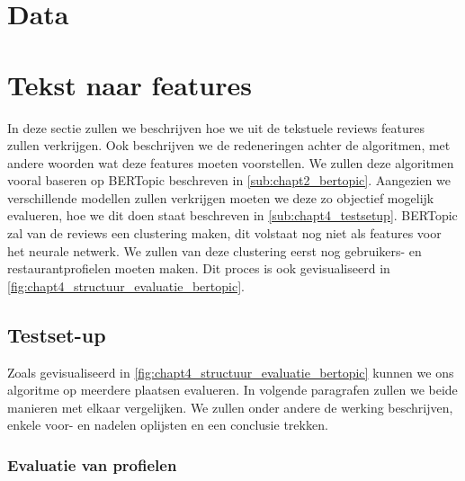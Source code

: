 \section{Data}
\label{sec:chapt4_data_test_train_uitleg}

\section{Tekst naar features}
\label{sec:chapt4_tekst_naar_features}
In deze sectie zullen we beschrijven hoe we uit de tekstuele reviews features zullen verkrijgen. Ook beschrijven we de redeneringen achter de algoritmen, met andere woorden wat deze features moeten voorstellen. We zullen deze algoritmen vooral baseren op BERTopic beschreven in \autoref{sub:chapt2_bertopic}. Aangezien we verschillende modellen zullen verkrijgen moeten we deze zo objectief mogelijk evalueren, hoe we dit doen staat beschreven in \autoref{sub:chapt4_testsetup}. BERTopic zal van de reviews een clustering maken, dit volstaat nog niet als features voor het neurale netwerk. We zullen van deze clustering eerst nog gebruikers- en restaurantprofielen moeten maken. Dit proces is ook gevisualiseerd in \autoref{fig:chapt4_structuur_evaluatie_bertopic}.


\subsection{Testset-up}
\label{sub:chapt4_testsetup}
Zoals gevisualiseerd in \autoref{fig:chapt4_structuur_evaluatie_bertopic} kunnen we ons algoritme op meerdere plaatsen evalueren. In volgende paragrafen zullen we beide manieren met elkaar vergelijken. We zullen onder andere de werking beschrijven, enkele voor- en nadelen oplijsten en een conclusie trekken.

\subsubsection{Evaluatie van profielen}

